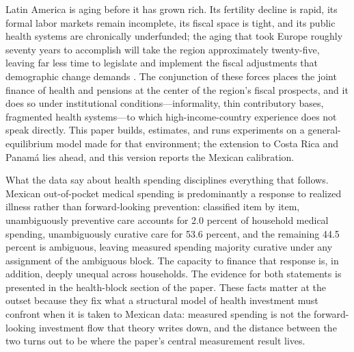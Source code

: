 \documentclass[12pt,a4paper]{article}
\begin{document}
Latin America is aging before it has grown rich. Its fertility decline is rapid, its formal labor markets remain incomplete, its fiscal space is tight, and its public health systems are chronically underfunded; the aging that took Europe roughly seventy years to accomplish will take the region approximately twenty-five, leaving far less time to legislate and implement the fiscal adjustments that demographic change demands \citep{WorldBankInformalizing2025}. The conjunction of these forces places the joint finance of health and pensions at the center of the region's fiscal prospects, and it does so under institutional conditions---informality, thin contributory bases, fragmented health systems---to which high-income-country experience does not speak directly. This paper builds, estimates, and runs experiments on a general-equilibrium model made for that environment; the extension to Costa Rica and Panam\'a lies ahead, and this version reports the Mexican calibration.

What the data say about health spending disciplines everything that follows. Mexican out-of-pocket medical spending is predominantly a response to realized illness rather than forward-looking prevention: classified item by item, unambiguously preventive care accounts for 2.0 percent of household medical spending, unambiguously curative care for 53.6 percent, and the remaining 44.5 percent is ambiguous, leaving measured spending majority curative under any assignment of the ambiguous block. The capacity to finance that response is, in addition, deeply unequal across households. The evidence for both statements is presented in the health-block section of the paper. %
These facts matter at the outset because they fix what a structural model of health investment must confront when it is taken to Mexican data: measured spending is not the forward-looking investment flow that theory writes down, and the distance between the two turns out to be where the paper's central measurement result lives.
\end{document}
